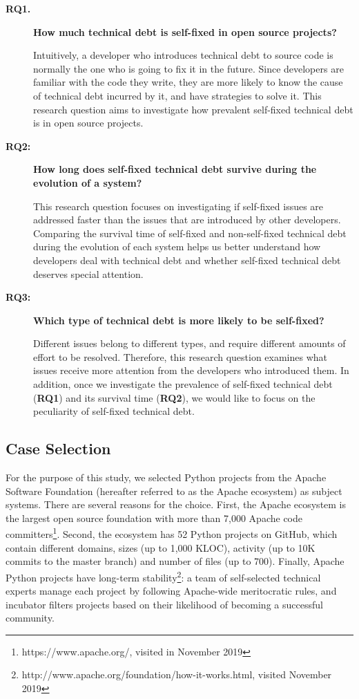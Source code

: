 \documentclass[sigconf,review]{acmart}
\newcommand{\question}[1]{{\textbf{#1}}}
\begin{document}
\begin{description}
\item [\textbf{RQ1.}] \question{How much technical debt is self-fixed in open source projects?}

Intuitively, a developer 
who introduces technical debt 
to source code 
is normally the one 
who is going to fix it 
in the future. 
Since developers are familiar 
with the code they write,
they are more likely to know 
the cause of technical debt 
incurred by it,
and have strategies 
to solve it.
This research question aims 
to investigate how prevalent 
self-fixed technical debt 
is in open source projects. 

\item [\textbf{RQ2:}]\question{How long does self-fixed technical debt survive during the evolution of a system?}

This research question focuses on 
investigating if self-fixed issues are addressed faster than 
the issues that are introduced
by other developers. 
Comparing the survival time 
of self-fixed and non-self-fixed technical debt during the evolution of each system 
helps us better understand 
how developers deal with technical debt and whether self-fixed technical debt deserves special attention.

\item [\textbf{RQ3:}]\question{Which type of technical debt is more likely to be self-fixed?}

Different issues belong to different types, 
and require different amounts of effort
to be resolved. 
Therefore, 
this research question examines 
what issues receive more attention 
from the developers who introduced them. 
In addition, 
once we investigate the prevalence 
of self-fixed technical debt (\textbf{RQ1}) 
and its survival time (\textbf{RQ2}), 
we would like to focus on the peculiarity of self-fixed technical debt.
\end{description}

\subsection{Case Selection}

For the purpose of this study, we selected Python projects from the Apache Software Foundation (hereafter referred to as the Apache ecosystem) as subject systems. There are several reasons for the choice. First, the Apache ecosystem is the largest open source foundation with more than 7,000 Apache code committers\footnote{https://www.apache.org/, visited in November 2019}. Second, the ecosystem has 52 Python projects on GitHub, which contain different domains, sizes (up to 1,000 KLOC), activity (up to 10K commits to the master branch) and number of files (up to 700). Finally, Apache Python projects have long-term stability\footnote{http://www.apache.org/foundation/how-it-works.html, visited November 2019}: a team of self-selected technical experts manage each project by following Apache-wide meritocratic rules, and incubator filters projects based on their likelihood of becoming a successful community.
\end{document}
